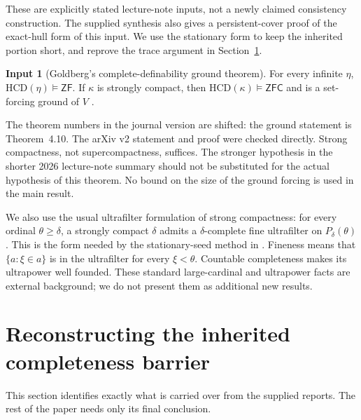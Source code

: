 \documentclass[11pt,letterpaper]{article}
\theoremstyle{definition}
\newtheorem{inputthm}{Input}
\numberwithin{equation}{section}
\newcommand{\ZFC}{\mathsf{ZFC}}
\newcommand{\ZF}{\mathsf{ZF}}
\newcommand{\HCD}{\mathrm{HCD}}
\begin{document}
These are explicitly stated lecture-note inputs, not a newly claimed
consistency construction. The supplied synthesis also gives a
persistent-cover proof of the exact-hull form of this input. We use the
stationary form to keep the inherited portion short, and reprove the
trace argument in Section~\ref{sec:barrier}.

\begin{inputthm}[Goldberg's complete-definability ground theorem]\label{in:ground}
For every infinite $\eta$, $\HCD(\eta)\models\ZF$. If $\kappa$ is
strongly compact, then $\HCD(\kappa)\models\ZFC$ and is a set-forcing
ground of $V$ \cite[Proposition~4.2, Theorems~4.3 and~4.9, arXiv v2]{unique}.
\end{inputthm}

The theorem numbers in the journal version are shifted: the ground
statement is Theorem~4.10. The arXiv v2 statement and proof were checked
directly. Strong compactness, not supercompactness, suffices. The
stronger hypothesis in the shorter 2026 lecture-note summary should not
be substituted for the actual hypothesis of this theorem. No bound on
the size of the ground forcing is used in the main result.

We also use the usual ultrafilter formulation of strong compactness:
for every ordinal $\theta\ge\delta$, a strongly compact $\delta$ admits
a $\delta$-complete fine ultrafilter on $P_\delta(\theta)$. This is the
form needed by the stationary-seed method in
\cite[Proposition~2.3]{dichotomy}. Fineness means that
$\{a:\xi\in a\}$ is in the ultrafilter for every $\xi<\theta$.
Countable completeness makes its ultrapower well founded. These
standard large-cardinal and ultrapower facts are external background;
we do not present them as additional new results.

\section{Reconstructing the inherited completeness barrier}\label{sec:barrier}

This section identifies exactly what is carried over from the supplied
reports. The rest of the paper needs only its final conclusion.
\end{document}
